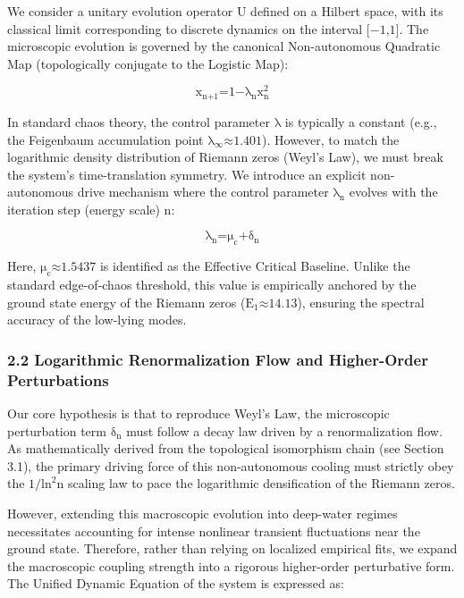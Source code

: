 We consider a unitary evolution operator \(\text{U}\) defined on a
Hilbert space, with its classical limit corresponding to discrete
dynamics on the interval \(\text{[−1,1]}\). The microscopic evolution is
governed by the canonical Non-autonomous Quadratic Map (topologically
conjugate to the Logistic Map):

\[\text{x}_{\text{n}\text{+1}}\text{=1−}\text{λ}_{\text{n}}\text{x}_{\text{n}}^{\text{2}}\]

In standard chaos theory, the control parameter \(\text{λ}\) is
typically a constant (e.g., the Feigenbaum accumulation point
\(\text{λ}_{\text{∞}}\text{≈1.401}\)). However, to match the logarithmic
density distribution of Riemann zeros (Weyl's Law), we must break the
system's time-translation symmetry. We introduce an explicit
non-autonomous drive mechanism where the control parameter
\(\text{λ}_{\text{n}}\) evolves with the iteration step (energy scale)
\(\text{n}\):

\[\text{λ}_{\text{n}}\text{=}\text{μ}_{\text{c}}\text{+}\text{δ}_{\text{n}}\]

Here, \(\text{μ}_{\text{c}}\text{≈1.5437}\) is identified as the
Effective Critical Baseline. Unlike the standard edge-of-chaos
threshold, this value is empirically anchored by the ground state energy
of the Riemann zeros (\(\text{E}_{\text{1}}\text{≈14.13}\)), ensuring
the spectral accuracy of the low-lying modes.

\hypertarget{logarithmic-renormalization-flow-and-higher-order-perturbations}{%
\subsubsection{\texorpdfstring{\textbf{2.2 Logarithmic Renormalization
Flow and Higher-Order
Perturbations}}{2.2 Logarithmic Renormalization Flow and Higher-Order Perturbations}}\label{logarithmic-renormalization-flow-and-higher-order-perturbations}}

Our core hypothesis is that to reproduce Weyl's Law, the microscopic
perturbation term \(\text{δ}_{\text{n}}\) must follow a decay law driven
by a renormalization flow. As mathematically derived from the
topological isomorphism chain (see Section 3.1), the primary driving
force of this non-autonomous cooling must strictly obey the
\(\text{1/}\text{ln}^{\text{2}}\text{n}\) scaling law to pace the
logarithmic densification of the Riemann zeros.

However, extending this macroscopic evolution into deep-water regimes
necessitates accounting for intense nonlinear transient fluctuations
near the ground state. Therefore, rather than relying on localized
empirical fits, we expand the macroscopic coupling strength into a
rigorous higher-order perturbative form. The Unified Dynamic Equation of
the system is expressed as:

